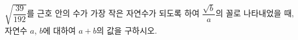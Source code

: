 $\sqrt{\dfrac{39}{192}}$를 근호 안의 수가 가장 작은 자연수가 되도록 하여 $\dfrac{\sqrt{b}}{a}$의 꼴로 나타내었을 때, 자연수 $a$, $b$에 대하여 $a+b$의 값을 구하시오.
